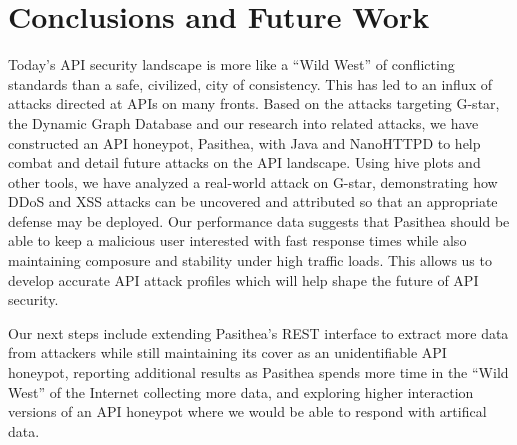 
\section{Conclusions and Future Work} \label{conclusions}

Today's API security landscape is more like a ``Wild West'' of conflicting standards than a safe, civilized, city of consistency.
This has led to an influx of attacks directed at APIs on many  fronts. 
Based on the attacks targeting G-star, the Dynamic Graph Database and our research into related attacks, we have constructed an API honeypot, Pasithea, with Java and NanoHTTPD to help combat and detail future attacks on the API landscape. 
Using hive plots and other tools, we have analyzed a real-world attack on G-star, demonstrating how DDoS and XSS attacks can be uncovered and attributed so that an appropriate defense may be deployed.  
Our performance data suggests that Pasithea should be able to keep a malicious user interested with fast response times while also maintaining composure and stability under high traffic loads. 
This allows us to develop accurate API attack profiles which will help shape the future of API security.

Our next steps include extending Pasithea’s REST interface to extract more data from attackers while still maintaining its cover as an unidentifiable API honeypot, reporting additional results as Pasithea spends more time in the ``Wild West'' of the Internet collecting more data, and exploring higher interaction versions of an API honeypot where we would be able to respond with artifical data.
